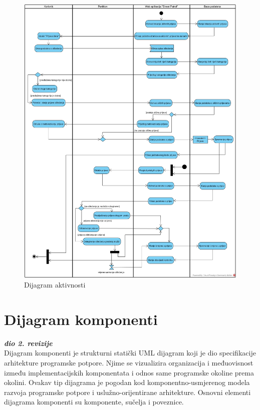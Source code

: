 			\begin{figure}[H]
				\includegraphics[width=\textwidth]{slike/dijagramAktivnosti.jpg} %
				\caption{Dijagram aktivnosti}
				\label{fig:dijagramAktivnosti} %
			\end{figure}
			
			\eject
			
			\section{Dijagram komponenti}
			
			\textbf{\textit{dio 2. revizije}}\\
	
			Dijagram komponenti je strukturni statički UML dijagram koji je dio specifikacije arhitekture programske potpore. Njime se vizualizira organizacija i međuovisnost između implementacijskih komponentata i odnos same programske okoline prema okolini. Ovakav tip dijagrama je pogodan kod komponentno-usmjerenog modela razvoja programske potpore i uslužno-orijentirane arhitekture. Osnovni elementi dijagrama komponenti su komponente, sučelja i poveznice.
			
